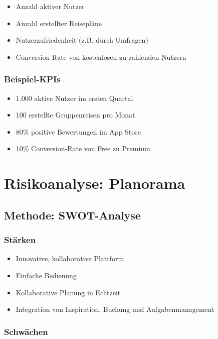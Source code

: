 \documentclass{article}
\begin{document}
\begin{itemize}
\tightlist
\item
  Anzahl aktiver Nutzer
\item
  Anzahl erstellter Reisepläne
\item
  Nutzerzufriedenheit (z.B. durch Umfragen)
\item
  Conversion-Rate von kostenlosen zu zahlenden Nutzern
\end{itemize}

\subsubsection{Beispiel-KPIs}\label{beispiel-kpis}

\begin{itemize}
\tightlist
\item
  1.000 aktive Nutzer im ersten Quartal
\item
  100 erstellte Gruppenreisen pro Monat
\item
  80\% positive Bewertungen im App Store
\item
  10\% Conversion-Rate von Free zu Premium
\end{itemize}

\newpage

\section{Risikoanalyse: Planorama}\label{risikoanalyse-planorama}

\subsection{Methode: SWOT-Analyse}\label{methode-swot-analyse}

\subsubsection{Stärken}\label{stuxe4rken}

\begin{itemize}
\tightlist
\item
  Innovative, kollaborative Plattform
\item
  Einfache Bedienung
\item
  Kollaborative Planung in Echtzeit
\item
  Integration von Inspiration, Buchung und Aufgabenmanagement
\end{itemize}

\subsubsection{Schwächen}\label{schwuxe4chen}
\end{document}
